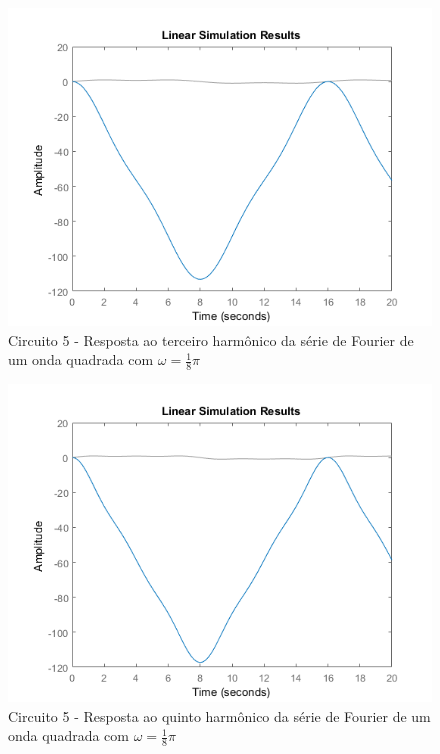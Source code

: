 \documentclass[a4paper, 12pt]{article}
\begin{document}
			\begin{figure}[!ht]
				\centering
				\includegraphics[scale=0.71]{img/1k_circ5.png}
				\caption{Circuito 5 - Resposta ao terceiro harmônico da série de Fourier de um onda quadrada com $\omega = \frac{1}{8}\pi$}	
			\end{figure}			
			\begin{figure}[!ht]
				\centering
				\includegraphics[scale=0.71]{img/1l_circ5.png}
				\caption{Circuito 5 - Resposta ao quinto harmônico da série de Fourier de um onda quadrada com $\omega = \frac{1}{8}\pi$}	
			\end{figure}		
\end{document}
